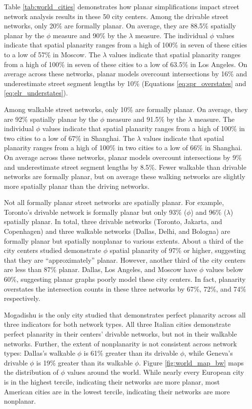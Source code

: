 \documentclass[Afour,sageh,times]{sagej}
\begin{document}
Table \ref{tab:world_cities} demonstrates how planar simplifications impact street network analysis results in these 50 city centers. Among the drivable street networks, only 20\% are formally planar. On average, they are 88.5\% spatially planar by the $\phi$ measure and 90\% by the $\lambda$ measure. The individual $\phi$ values indicate that spatial planarity ranges from a high of 100\% in seven of these cities to a low of 57\% in Moscow. The $\lambda$ values indicate that spatial planarity ranges from a high of 100\% in seven of these cities to a low of 63.5\% in Los Angeles. On average across these networks, planar models overcount intersections by 16\% and underestimate street segment lengths by 10\% (Equations \ref{eq:spr_overstates} and \ref{eq:elr_understates}).

Among walkable street networks, only 10\% are formally planar. On average, they are 92\% spatially planar by the $\phi$ measure and 91.5\% by the $\lambda$ measure. The individual $\phi$ values indicate that spatial planarity ranges from a high of 100\% in two cities to a low of 67\% in Shanghai. The $\lambda$ values indicate that spatial planarity ranges from a high of 100\% in two cities to a low of 66\% in Shanghai. On average across these networks, planar models overcount intersections by 9\% and underestimate street segment lengths by 8.5\%. Fewer walkable than drivable networks are formally planar, but on average these walking networks are slightly more spatially planar than the driving networks.

Not all formally planar street networks are spatially planar. For example, Toronto's drivable network is formally planar but only 93\% ($\phi$) and 96\% ($\lambda$) spatially planar. In total, three drivable networks (Toronto, Jakarta, and Copenhagen) and three walkable networks (Dallas, Delhi, and Bologna) are formally planar but spatially nonplanar to various extents. About a third of the city centers studied demonstrate $\phi$ spatial planarity of 97\% or higher, suggesting that they are \enquote{approximately} planar. However, another third of the city centers are less than 87\% planar. Dallas, Los Angeles, and Moscow have $\phi$ values below 60\%, suggesting planar graphs poorly model these city centers. In fact, planarity overstates the intersection counts in these three networks by 67\%, 72\%, and 74\% respectively.

Mogadishu is the only city studied that demonstrates perfect planarity across all three indicators for both network types. All three Italian cities demonstrate perfect planarity in their centers' drivable networks, but not in their walkable networks. Further, the extent of nonplanarity is not consistent across network types: Dallas's walkable $\phi$ is 61\% greater than its drivable $\phi$, while Geneva's drivable $\phi$ is 19\% greater than its walkable $\phi$. Figure \ref{fig:world_map_bw} maps the distribution of $\phi$ values around the world. While nearly every European city is in the highest tercile, indicating their networks are more planar, most American cities are in the lowest tercile, indicating their networks are more nonplanar.
\end{document}
